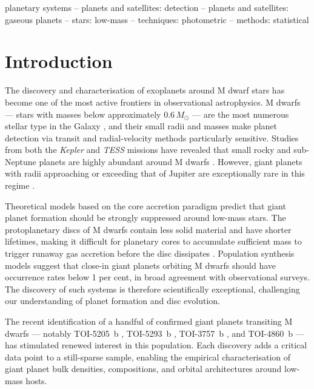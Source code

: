 \documentclass[fleqn,usenatbib]{mnras}
\newcommand{\Msun}{M_{\odot}}
\begin{document}
\begin{keywords}
planetary systems -- planets and satellites: detection -- planets and satellites: gaseous planets -- stars: low-mass -- techniques: photometric -- methods: statistical
\end{keywords}

\section{Introduction}
\label{sec:intro}

The discovery and characterisation of exoplanets around M dwarf stars has become one of the most active frontiers in observational astrophysics. M dwarfs — stars with masses below approximately $0.6\,\Msun$ — are the most numerous stellar type in the Galaxy \citep{dressing2015}, and their small radii and masses make planet detection via transit and radial-velocity methods particularly sensitive. Studies from both the \textit{Kepler} and \textit{TESS} missions have revealed that small rocky and sub-Neptune planets are highly abundant around M dwarfs \citep{dressing2015}. However, giant planets with radii approaching or exceeding that of Jupiter are exceptionally rare in this regime \citep{endl2006, johnson2010}.

Theoretical models based on the core accretion paradigm \citep{mordasini2009} predict that giant planet formation should be strongly suppressed around low-mass stars. The protoplanetary discs of M dwarfs contain less solid material and have shorter lifetimes, making it difficult for planetary cores to accumulate sufficient mass to trigger runaway gas accretion before the disc dissipates \citep{burn2021}. Population synthesis models \citep{schlecker2022} suggest that close-in giant planets orbiting M dwarfs should have occurrence rates below 1 per cent, in broad agreement with observational surveys. The discovery of such systems is therefore scientifically exceptional, challenging our understanding of planet formation and disc evolution.

The recent identification of a handful of confirmed giant planets transiting M dwarfs — notably TOI-5205~b \citep{kanodia2023}, TOI-5293~b \citep{toi5293}, TOI-3757~b \citep{toi3757}, and TOI-4860~b \citep{toi4860} — has stimulated renewed interest in this population. Each discovery adds a critical data point to a still-sparse sample, enabling the empirical characterisation of giant planet bulk densities, compositions, and orbital architectures around low-mass hosts.
\end{document}
